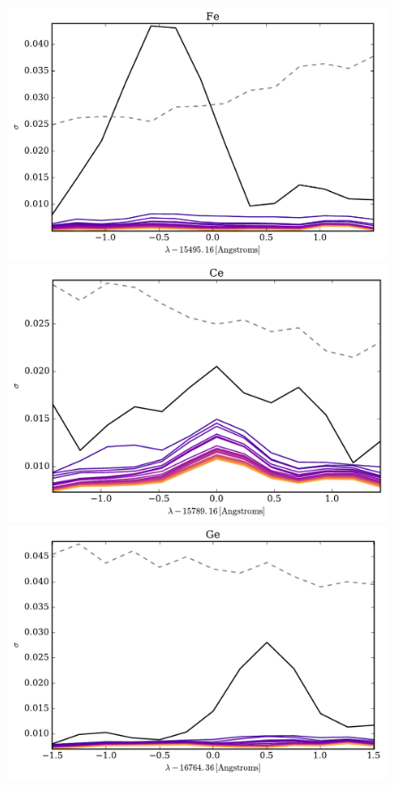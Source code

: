 \documentclass[a4paper,fleqn,usenatbib]{mnras}
\begin{document}
\begin{figure}
	\includegraphics[width=\columnwidth]{apogee_centers_final_29502_spc_win_wid_1p5_fe_conditional_stddevs.pdf}
	\includegraphics[width=\columnwidth]{apogee_centers_final_29502_spc_win_wid_1p5_ce_conditional_stddevs.pdf}
	\includegraphics[width=\columnwidth]{apogee_centers_final_29502_spc_win_wid_1p5_ge_conditional_stddevs.pdf}

\end{figure}
\end{document}
